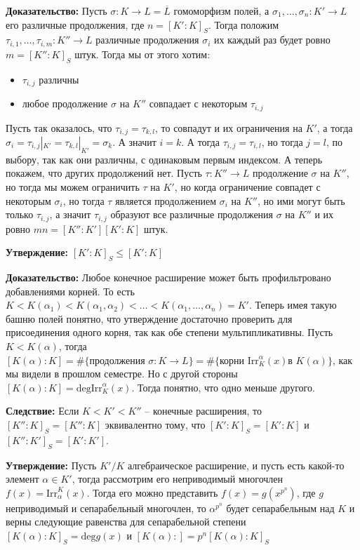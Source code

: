 \documentclass[a4paper, 12pt]{book}
\begin{document}
\textbf{Доказательство:} Пусть $\sigma:K\rightarrow L=\overline L$ гомоморфизм
полей, а $\sigma_1,\ldots,\sigma_n:K'\rightarrow L$ его различные продолжения,
где $n=[K':K]_S$. Тогда положим $\tau_{i,1},\ldots,\tau_{i,m}:K''\rightarrow L$
различные продолжения $\sigma_i$ их каждый раз будет ровно $m=[K'':K]_S$ штук.
Тогда мы от этого хотим:
\begin{itemize}
    \item $\tau_{i,j}$ различны
    \item любое продолжение $\sigma$ на $K''$ совпадает с некоторым $\tau_{i,j}$
\end{itemize}
Пусть так оказалось, что $\tau_{i,j}=\tau_{k,l}$, то совпадут и их ограничения
на $K'$, а тогда $\sigma_i=\tau_{i,j}|_{K'}=\tau_{k,l}|_{K'}=\sigma_k$. А значит
$i=k$. А тогда $\tau_{i,j}=\tau_{i,l}$, но тогда $j=l$, по выбору, так как они
различны, с одинаковым первым индексом. А теперь покажем, что других продолжений
нет. Пусть $\tau:K''\rightarrow L$ продолжение $\sigma$ на $K''$, но тогда мы
можем ограничить $\tau$ на $K'$, но когда ограничение совпадет с некоторым
$\sigma_i$, но тогда $\tau$ является продолжением $\sigma_i$ на $K''$, но ими
могут быть только $\tau_{i,j}$, а значит $\tau_{i,j}$ образуют все различные
продолжения $\sigma$ на $K''$ и их ровно $mn=[K'':K'][K':K]$ штук.

\textbf{Утверждение:} $[K':K]_S\leq[K':K]$

\textbf{Доказательство:} Любое конечное расширение может быть профильтровано
добавлениями корней. То есть $K<K(\alpha_1)<K(\alpha_1,\alpha_2)<\ldots<K(\alpha_1,
\ldots,\alpha_n)=K'$. Теперь имея такую башню полей понятно, что утверждение
достаточно проверить для присоединения одного корня, так как обе степени
мультипликативны. Пусть $K<K(\alpha)$, тогда $[K(\alpha):K]=\#\{\text{
    продолжения }\sigma:K\rightarrow L\}=\#\{\text{корни }\text{Irr}_K^\alpha(x)
\text{в }K(\alpha)\}$, как мы видели в прошлом семестре. Но с другой стороны $[K(
\alpha):K]=\text{deg}\text{Irr}_K^\alpha(x)$. Тогда понятно, что одно меньше
другого.

\textbf{Следствие:} Если $K<K'<K''$ – конечные расширения, то $[K'':K]_S=[K'':K]$
эквивалентно тому, что $[K':K]_S=[K':K]$ и $[K'':K']_S=[K':K']$.

\textbf{Утверждение:} Пусть $K'/K$ алгебраическое расширение, и пусть есть какой-то
элемент $\alpha\in K'$, тогда рассмотрим его неприводимый многочлен $f(x)=
\text{Irr}_\alpha^K(x)$. Тогда его можно представить $f(x)=g(x^{p^n})$, где $g$
неприводимый и сепарабельный многочлен, то $\alpha^{p^n}$ будет сепарабельным
над $K$ и верны следующие равенства для сепарабельной степени $[K(\alpha):K]_S
=\text{deg}g(x)$ и $[K(\alpha):]=p^n[K(\alpha):K]_S$
\end{document}
